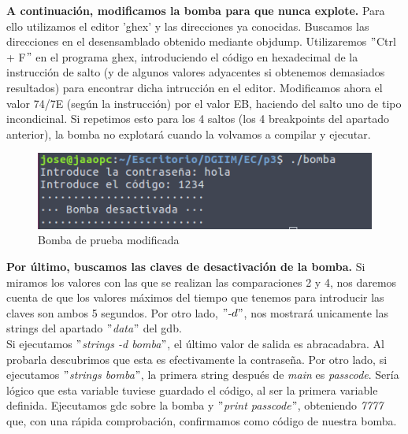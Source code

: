 \documentclass[11pt,a4paper]{article}
\begin{document}
\textbf{A continuación, modificamos la bomba para que nunca explote.}  Para ello utilizamos el editor 'ghex' y las direcciones ya conocidas. Buscamos las direcciones en el desensamblado obtenido mediante objdump. Utilizaremos $"$Ctrl + F$"$ en el programa ghex, introduciendo el código en hexadecimal de la instrucción de salto (y de algunos valores adyacentes si obtenemos demasiados resultados) para encontrar dicha intrucción en el editor. Modificamos ahora el valor 74/7E (según la instrucción) por el valor EB, haciendo del salto uno de tipo incondicinal. Si repetimos esto para los 4 saltos (los 4 breakpoints del apartado anterior), la bomba no explotará cuando la volvamos a compilar y ejecutar. \\

\begin{figure}[H] 
 \centering
 \includegraphics[scale=0.45]{capturas/prueba2.png} 
 \caption{Bomba de prueba modificada} \label{fig:figura25}
\end{figure}

\textbf{Por último, buscamos las claves de desactivación de la bomba.} Si miramos los valores con las que se realizan las comparaciones 2 y 4, nos daremos cuenta de que los valores máximos del tiempo que tenemos para introducir las claves son ambos 5 segundos. Por otro lado, $"$-$d"$, nos mostrará unicamente las strings del apartado $"$\emph{data}$"$ del gdb. \\

Si ejecutamos $"$\emph{strings -d bomba}$"$, el último valor de salida es abracadabra. Al probarla descubrimos que esta es efectivamente la contraseña. Por otro lado, si ejecutamos $"$\emph{strings bomba}$"$, la primera string después de \emph{main} es \emph{passcode}. Sería lógico que esta variable tuviese guardado el código, al ser la primera variable definida. Ejecutamos gdc sobre la bomba y $"$\emph{print passcode}$"$, obteniendo \emph{7777} que, con una rápida comprobación, confirmamos como código de nuestra bomba. \\
\end{document}
